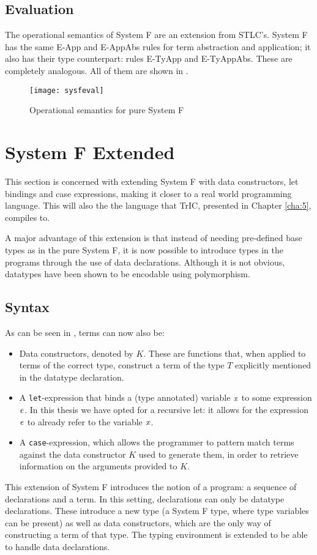 \subsection{Evaluation}
The operational semantics of System F are an extension from STLC's. System F has the same E-App and E-AppAbs rules for term abstraction and application; it also has their type counterpart: rules E-TyApp and E-TyAppAbs. These are completely analogous. All of them are shown in .

\begin{figure}
  \centering
  \texttt{[image: sysfeval]}
  \caption{Operational semantics for pure System F}
  \label{sysfeval}
\end{figure}


\section{System F Extended}
\label{System F extended}
This section is concerned with extending System F with data constructors, let bindings and case expressions, making it closer to a real world programming language. This will also the the language that TrIC, presented in Chapter \ref{cha:5}, compiles to.

A major advantage of this extension is that instead of needing pre-defined base types as in the pure System F, it is now possible to introduce types in the programs through the use of data declarations. Although it is not obvious, datatypes have been shown to be encodable using polymorphism.

\subsection{Syntax}
As can be seen in , terms can now also be:
\begin{itemize}
\item Data constructors, denoted by $K$. These are functions that, when applied to terms of the correct type, construct a term of the type $T$ explicitly mentioned in the datatype declaration.
\item A \texttt{let}-expression that binds a (type annotated) variable $\mathit{x}$ to some expression $\mathit{e}$. In this thesis we have opted for a recursive let: it allows for the expression $\mathit{e}$ to already refer to the variable $\mathit{x}$.
\item A \texttt{case}-expression, which allows the programmer to pattern match terms against the data constructor $K$ used to generate them, in order to retrieve information on the arguments provided to $K$.
\end{itemize}
This extension of System F introduces the notion of a program: a sequence of declarations and a term. In this setting, declarations can only be datatype declarations. These introduce a new type (a System F type, where type variables can be present) as well as data constructors, which are the only way of constructing a term of that type. The typing environment is extended to be able to handle data declarations.

